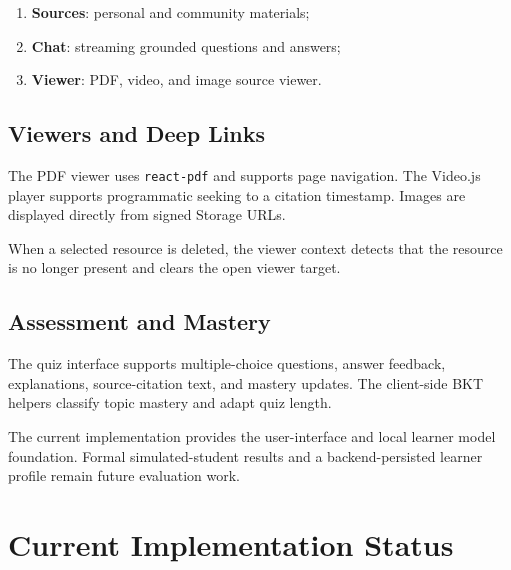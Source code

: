 \documentclass[11pt,a4paper]{article}
\begin{document}
\begin{enumerate}[leftmargin=*]
  \item \textbf{Sources}: personal and community materials;
  \item \textbf{Chat}: streaming grounded questions and answers;
  \item \textbf{Viewer}: PDF, video, and image source viewer.
\end{enumerate}

\subsection{Viewers and Deep Links}

The PDF viewer uses \texttt{react-pdf} and supports page navigation. The
Video.js player supports programmatic seeking to a citation timestamp. Images
are displayed directly from signed Storage URLs.

When a selected resource is deleted, the viewer context detects that the
resource is no longer present and clears the open viewer target.

\subsection{Assessment and Mastery}

The quiz interface supports multiple-choice questions, answer feedback,
explanations, source-citation text, and mastery updates. The client-side BKT
helpers classify topic mastery and adapt quiz length.

The current implementation provides the user-interface and local learner
model foundation. Formal simulated-student results and a backend-persisted
learner profile remain future evaluation work.

\section{Current Implementation Status}
\end{document}
